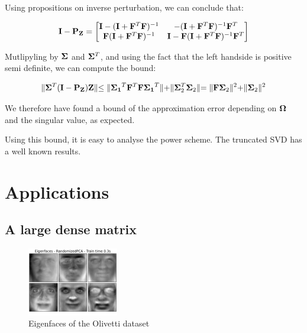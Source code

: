 \documentclass[onecolumn,12pt]{article}
\begin{document}
Using propositions on inverse perturbation, we can conclude that:

\begin{equation}
\bold{I} - \bold{P_Z} =
    \begin{bmatrix}
    \bold{I} - (\bold{I} + \bold{F}^T \bold{F})^{-1} & - (\bold{I} +
    \bold{F}^T \bold{F})^{-1}\bold{F}^T \\
    \bold{F}(\bold{I} + \bold{F}^T \bold{F})^{-1}  & \bold{I} -
    \bold{F}(\bold{I} + \bold{F}^T \bold{F})^{-1} \bold{F}^T
    \end{bmatrix}
\end{equation}

Mutlipyling by $\bold{\Sigma}$ and $\bold{\Sigma}^T$, and using the fact that
the left handside is positive semi definite, we can compute the bound:

\begin{equation}
\lVert \bold{\Sigma}^T (\bold{I} - \bold{P_Z}) \bold{Z} \lVert \leq
\lVert \bold{\Sigma_1}^T \bold{F}^T \bold{F} \bold{\Sigma_1}^T\lVert +
\lVert \bold{\Sigma}_2^T \bold{\Sigma}_2 \lVert  =
\lVert \bold{F} \bold{\Sigma}_ 2\lVert^2 + \lVert \bold{\Sigma}_2 \lVert^2
\end{equation}

We therefore have found a bound of the approximation error depending on
$\bold{\Omega}$ and the singular value, as expected.

Using this bound, it is easy to analyse the power scheme. The truncated SVD
has a well known results.

\section{Applications}
\subsection{A large dense matrix}
\begin{figure}[h]
\label{eigenfaces}
\caption{Eigenfaces of the Olivetti dataset}
\includegraphics[width=150px]{./images/plot_faces_decomposition_2.png}
\end{figure}
\end{document}
